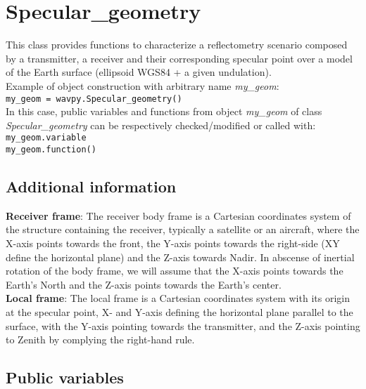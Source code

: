 \chapter{Specular\_geometry}\label{cha:geom}

This class provides functions to characterize a reflectometry scenario composed by a transmitter, a receiver and their corresponding specular point over a model of the Earth surface (ellipsoid WGS84 + a given undulation).\\

Example of object construction with arbitrary name {\it my\_geom}:\\

\texttt{my\_geom = wavpy.Specular\_geometry()}\\

In this case, public variables and functions from object {\it my\_geom} of class {\it Specular\_geometry} can be respectively checked/modified or called with:\\

\texttt{my\_geom.variable}\\

\texttt{my\_geom.function()}\\

\section{Additional information}

{\bf Receiver frame}: The receiver body frame is a Cartesian coordinates system of the structure containing the receiver, typically a satellite or an aircraft, where the X-axis points towards the front, the Y-axis points towards the right-side (XY define the horizontal plane) and the Z-axis towards Nadir. In abscense of inertial rotation of the body frame, we will assume that the X-axis points towards the Earth's North and the Z-axis points towards the Earth's center.\\

{\bf Local frame}: The local frame is a Cartesian coordinates system with its origin at the specular point, X- and Y-axis defining the horizontal plane parallel to the surface, with the Y-axis pointing towards the transmitter, and the Z-axis pointing to Zenith by complying the right-hand rule.

\section{Public variables}


